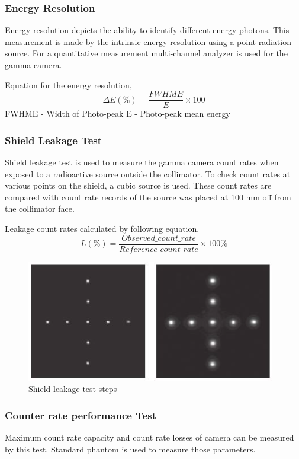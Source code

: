 \documentclass[12pt]{article}
\begin{document}
\subsubsection{Energy Resolution}
Energy resolution depicts the ability to identify different energy photons. This measurement is made by the intrinsic energy resolution using a point radiation source. For a quantitative measurement multi-channel analyzer is used for the gamma camera. 

Equation for the energy resolution,
\begin{equation*}
    \Delta E (\%) = \frac{FWHME}{E} \times 100
\end{equation*}
FWHME - Width of Photo-peak
E - Photo-peak mean energy

\subsubsection{Shield Leakage Test}
Shield leakage test  is used to measure the gamma camera count rates when exposed to a radioactive source outside the collimator. To check count rates at various points on the shield, a cubic source is used. These count rates are compared with count rate records of the source was placed at 100 mm off from the collimator face.

Leakage count rates calculated by following equation. 
\begin{equation*}
    L (\%) = \frac{Observed\_count\_rate}{Reference\_count\_rate} \times 100\%
\end{equation*}
\begin{figure}[h!]
    \centering
    \includegraphics[width=0.45\linewidth]{sh.png}
    \caption{\small{Shield leakage test steps }}
    \label{fig:Shield leakage test steps}
\end{figure}

\subsubsection{Counter rate performance Test}
Maximum count rate capacity and count rate losses of camera can be measured by this test. Standard phantom is used to measure those parameters.
\end{document}
